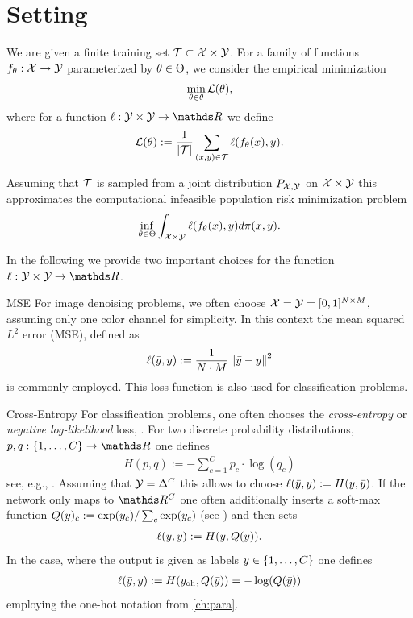 \section{Setting}\label{sec:SLSet}
%
We are given a finite training set $\mathcal{T}\subset\mathcal{X}\times\mathcal{Y}$. For a family of functions $f_\theta:\mathcal{X}\to\mathcal{Y}$ parameterized by $\theta\in \Theta$, we consider the empirical  minimization
%
\begin{align*}
\min_{\theta\in\theta} \mathcal{L}(\theta),
\end{align*} 
%
where for a function $\ell:\OutSpace\times\OutSpace\to\R$ we define
\begin{align}\label{eq:empLoss}
\mathcal{L}(\theta)  := \frac{1}{\left|\mathcal{T}\right|}\sum_{(x,y)\in \mathcal{T}} \ell(f_\theta(x), y).
\end{align}
%
%
\begin{remark}{}{}
%
Assuming that $\mathcal{T}$ is sampled from a joint distribution $P_{\mathcal{X},\mathcal{\mathcal{Y}}}$ on $\mathcal{X}\times\mathcal{\mathcal{Y}}$ this approximates the computational infeasible population risk minimization problem
%
\begin{align*}
\inf_{\theta\in\Theta}\int_{\mathcal{X}\times\mathcal{Y}} \ell(f_\theta(x), y) d\pi(x,y).
\end{align*}
\end{remark}
%
%
\noindent%
In the following we provide two important choices for the function $\ell:\Oup\times\Oup\to\R$.
%
%
\begin{example}{MSE}{}
For image denoising problems, we often choose $\mathcal{X}=\mathcal{\mathcal{Y}}=[0,1]^{N\times M}$, assuming only one color channel for simplicity. In this context the mean squared $L^2$ error (MSE), defined as
%
\begin{align*}
\ell(\bar{y},y) := \frac{1}{N\cdot M} \left\|\bar{y}-y\right\|^2
\end{align*}
%
is commonly employed. This loss function is also used for classification problems.
\end{example}
%
%
\begin{example}{Cross-Entropy}{}
For classification problems, one often chooses the \emph{cross-entropy} or \emph{negative log-likelihood} loss, \cite{good1952rational}. For two discrete probability distributions, $p,q:\{1,\ldots,C\}\to\R$ one defines
%
\begin{align*}
H(p,q) := -\sum_{c=1}^C p_c\cdot \log(q_c)
\end{align*}
%
see, e.g., \cite{cybenko1998mathematics}. Assuming that $\mathcal{\mathcal{Y}}=\Delta^C$ this allows to choose $\ell(\bar{y},y):=H(y, \bar{y})$. If the network only maps to $\R^C$ one often additionally inserts a soft-max function $Q(y)_c:= \exp(y_c)/\sum_c \exp(y_c)$ (see \cite{boltzmann1868studien}) and then sets
%
\begin{align*}
\ell(\bar{y}, y) := H(y, Q(\bar{y})).
\end{align*}
%
In the case, where the output is given as labels $y\in\{1,\ldots,C\}$ one defines
%
\begin{align*}
\ell(\bar{y}, y) := H(y_{{\operatorname{oh}}}, Q(\bar{y})) = -\log(Q(\bar{y}))
\end{align*}
%
employing the one-hot notation from \cref{ch:para}.
%
\end{example}
%
%
